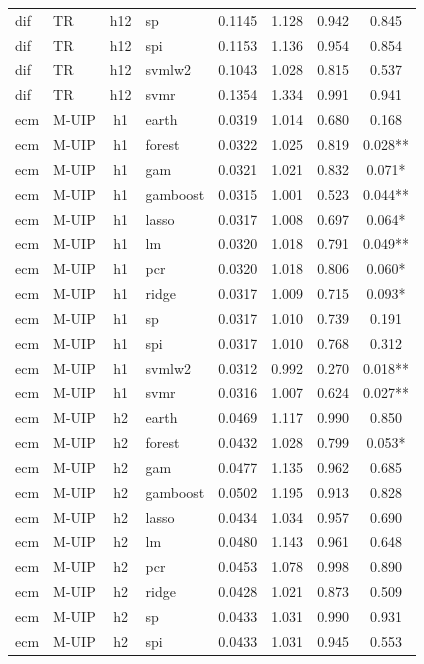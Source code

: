 \begin{ThreePartTable}
\begin{longtable}[t]{llclcccc}
dif & TR & h12 & sp & 0.1145 & 1.128 & 0.942 & 0.845\\
dif & TR & h12 & spi & 0.1153 & 1.136 & 0.954 & 0.854\\
dif & TR & h12 & svmlw2 & 0.1043 & 1.028 & 0.815 & 0.537\\
dif & TR & h12 & svmr & 0.1354 & 1.334 & 0.991 & 0.941\\
\addlinespace
ecm & M-UIP & h1 & earth & 0.0319 & 1.014 & 0.680 & 0.168\\
ecm & M-UIP & h1 & forest & 0.0322 & 1.025 & 0.819 & 0.028**\\
ecm & M-UIP & h1 & gam & 0.0321 & 1.021 & 0.832 & 0.071*\\
ecm & M-UIP & h1 & gamboost & 0.0315 & 1.001 & 0.523 & 0.044**\\
ecm & M-UIP & h1 & lasso & 0.0317 & 1.008 & 0.697 & 0.064*\\
ecm & M-UIP & h1 & lm & 0.0320 & 1.018 & 0.791 & 0.049**\\
ecm & M-UIP & h1 & pcr & 0.0320 & 1.018 & 0.806 & 0.060*\\
ecm & M-UIP & h1 & ridge & 0.0317 & 1.009 & 0.715 & 0.093*\\
ecm & M-UIP & h1 & sp & 0.0317 & 1.010 & 0.739 & 0.191\\
ecm & M-UIP & h1 & spi & 0.0317 & 1.010 & 0.768 & 0.312\\
ecm & M-UIP & h1 & svmlw2 & 0.0312 & 0.992 & 0.270 & 0.018**\\
ecm & M-UIP & h1 & svmr & 0.0316 & 1.007 & 0.624 & 0.027**\\
\addlinespace
ecm & M-UIP & h2 & earth & 0.0469 & 1.117 & 0.990 & 0.850\\
ecm & M-UIP & h2 & forest & 0.0432 & 1.028 & 0.799 & 0.053*\\
ecm & M-UIP & h2 & gam & 0.0477 & 1.135 & 0.962 & 0.685\\
ecm & M-UIP & h2 & gamboost & 0.0502 & 1.195 & 0.913 & 0.828\\
ecm & M-UIP & h2 & lasso & 0.0434 & 1.034 & 0.957 & 0.690\\
ecm & M-UIP & h2 & lm & 0.0480 & 1.143 & 0.961 & 0.648\\
ecm & M-UIP & h2 & pcr & 0.0453 & 1.078 & 0.998 & 0.890\\
ecm & M-UIP & h2 & ridge & 0.0428 & 1.021 & 0.873 & 0.509\\
ecm & M-UIP & h2 & sp & 0.0433 & 1.031 & 0.990 & 0.931\\
ecm & M-UIP & h2 & spi & 0.0433 & 1.031 & 0.945 & 0.553\\

\end{longtable}
\end{ThreePartTable}
